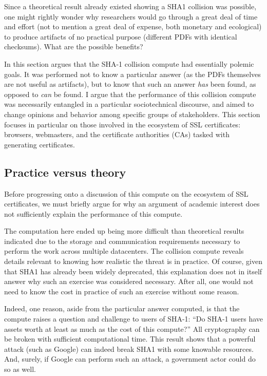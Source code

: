 \documentclass[sigconf]{acmart}
\begin{document}
Since a theoretical result already existed showing a SHA1 collision was possible, 
one might rightly wonder why researchers would go through a great deal of time and effort
(not to mention a great deal of expense, both monetary and ecological)
to produce artifacts of no practical purpose (different PDFs with identical checksums).
What are the possible benefits?

In this section argues that
the SHA-1 collision compute had essentially polemic goals.
It was performed not to know a particular answer
(as the PDFs themselves are not useful as artifacts), 
but to know that such an answer \emph{has} been found,
as opposed to \emph{can} be found.
I argue that the performance of this collision compute
was necessarily entangled in a particular sociotechnical discourse,
and aimed to change opinions and behavior among specific groups of stakeholders.
This section focuses in particular on those involved in the ecosystem of SSL certificates: browsers, webmasters, and the certificate authorities (CAs) tasked with generating certificates.

\subsection{Practice versus theory}
\label{sec:orga4c40e6}

Before progressing onto a discussion of this compute on the ecosystem of SSL certificates,
we must briefly argue for why an argument of academic interest does not sufficiently explain the performance of this compute.

The computation here ended up being more difficult than theoretical results indicated due to the storage and communication requirements necessary to perform the work across multiple datacenters. 
The collision compute reveals details relevant
to knowing how realistic the threat is in practice. 
Of course, given that SHA1 has already been widely deprecated, this explanation does not in itself answer why such an exercise was considered necessary.
After all, one would not need to know the cost in practice of such an exercise without some reason.

Indeed, one reason, aside from the particular answer computed, is that the compute raises a question and challenge to users of SHA-1:
``Do SHA-1 users have assets worth at least as much as the cost of this compute?''
All cryptography can be broken with sufficient computational time.
This result shows that a powerful attack (such as Google) can indeed break SHA1 with some knowable resources.
And, surely, if Google can perform such an attack, a government actor could do so as well.
\end{document}
